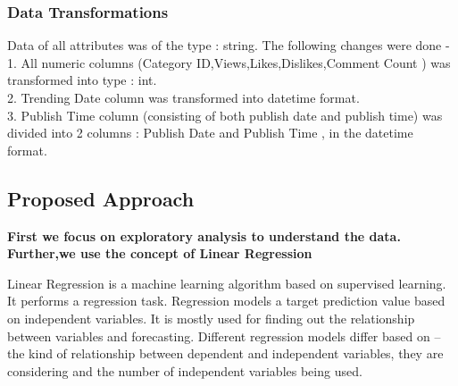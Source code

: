 \documentclass[runningheads]{llncs}
\begin{document}
\subsubsection{Data Transformations}
Data of all attributes was of the type : string. 
The following changes were done - \\
1. All numeric columns (Category ID,Views,Likes,Dislikes,Comment Count ) was transformed into type : int. \\
2. Trending Date column was transformed into datetime format. \\
3. Publish Time column (consisting of both publish date and publish time) was divided into 2 columns : Publish Date and Publish Time , in the datetime format.

\subsection{Proposed Approach}
\textbf{ First we focus on exploratory analysis to understand the data.
Further,we use the concept of Linear Regression
}

Linear Regression is a machine learning algorithm based on supervised learning. It performs a regression task. Regression models a target prediction value based on independent variables. It is mostly used for finding out the relationship between variables and forecasting. Different regression models differ based on – the kind of relationship between dependent and independent variables, they are considering and the number of independent variables being used.
\end{document}
